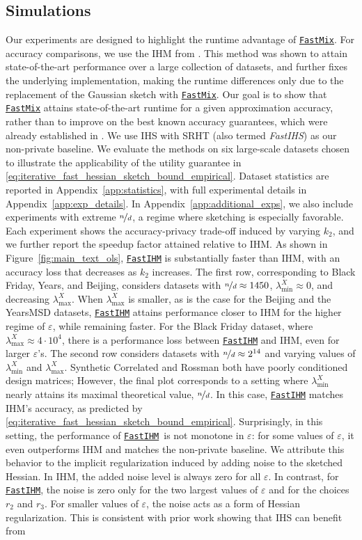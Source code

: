 \documentclass[11pt]{article}
\theoremstyle{definition}
\theoremstyle{plain}
\providecommand{\appendixref}[1]{Appendix~\ref{#1}}
\providecommand{\figureref}[1]{Figure~\ref{#1}}
\newcommand{\eps}{{\varepsilon}}
\renewcommand{\eps}{\varepsilon}
\newcommand{\FastMix}{\hyperref[alg:fast_mixing]{\texttt{FastMix}}\xspace}
\newcommand{\FastIHM}{\hyperref[alg:private_fast_hessian_sketch]{\texttt{FastIHM}}\xspace}
\begin{document}
\subsection{Simulations}
\label{s:sims}
Our experiments are designed to highlight the runtime advantage of \FastMix. For accuracy comparisons, we use the IHM from \citet{lev2026near}. This method was shown to attain state-of-the-art performance over a large collection of datasets, and further fixes the underlying implementation, making the runtime differences only due to the replacement of the Gaussian sketch with \FastMix. Our goal is to show that \FastMix attains state-of-the-art runtime for a given approximation accuracy, rather than to improve on the best known accuracy guarantees, which were already established in \citep{lev2026near}. We use IHS with SRHT (also termed \emph{FastIHS}) as our non-private baseline. We evaluate the methods on six large-scale datasets chosen to illustrate the applicability of the utility guarantee in \eqref{eq:iterative_fast_hessian_sketch_bound_empirical}. Dataset statistics are reported in \appendixref{app:statistics}, with full experimental details in \appendixref{app:exp_details}. In \appendixref{app:additional_exps}, we also include experiments with extreme $\nicefrac{n}{d}$, a regime where sketching is especially favorable. Each experiment shows the accuracy-privacy trade-off induced by varying $k_2$, and we further report the speedup factor attained relative to IHM. As shown in \figureref{fig:main_text_ols}, \FastIHM is substantially faster than IHM, with an accuracy loss that decreases as $k_2$ increases. The first row, corresponding to Black Friday, Years, and Beijing, considers datasets with $\nicefrac{n}{d} \approx 1450$, $\lambda_{\min}^{X} \approx 0$, and decreasing $\lambda_{\max}^{X}$. When $\lambda_{\max}^{X}$ is smaller, as is the case for the Beijing and the YearsMSD datasets, \FastIHM attains performance closer to IHM for the higher regime of $\eps$, while remaining faster. For the Black Friday dataset, where $\lambda^{X}_{\max}\approx 4\cdot 10^{4}$, there is a performance loss between \FastIHM and IHM, even for larger $\eps$'s. The second row considers datasets with $\nicefrac{n}{d} \approx 2^{14}$ and varying values of $\lambda_{\min}^{X}$ and $\lambda_{\max}^{X}$. Synthetic Correlated and Rossman both have poorly conditioned design matrices; However, the final plot corresponds to a setting where $\lambda_{\min}^{X}$ nearly attains its maximal theoretical value, $\nicefrac{n}{d}$. In this case, \FastIHM matches IHM's accuracy, as predicted by \eqref{eq:iterative_fast_hessian_sketch_bound_empirical}. Surprisingly, in this setting, the performance of \FastIHM\ is not monotone in $\eps$: for some values of $\eps$, it even outperforms IHM and matches the non-private baseline. We attribute this behavior to the implicit regularization induced by adding noise to the sketched Hessian. In IHM, the added noise level is always zero for all $\eps$. In contrast, for \FastIHM, the noise is zero only for the two largest values of $\eps$ and for the choices $r_2$ and $r_3$. For smaller values of $\eps$, the noise acts as a form of Hessian regularization. This is consistent with prior work showing that IHS can benefit from 
\end{document}
